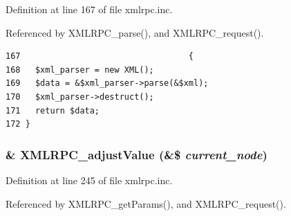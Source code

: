 Definition at line 167 of file xmlrpc.inc.

Referenced by XMLRPC\_\-parse(), and XMLRPC\_\-request().

\begin{Code}\begin{verbatim}167                                  {
168   $xml_parser = new XML();
169   $data = &$xml_parser->parse(&$xml);
170   $xml_parser->destruct();
171   return $data;
172 }
\end{verbatim}
\end{Code}


\hypertarget{xmlrpc_8inc_d936fe41ae9c3e0b90bd72ffe82a2969}{
\subsubsection{\setlength{\rightskip}{0pt plus 5cm}\& XMLRPC\_\-adjustValue (\&\$ {\em current\_\-node})}}
\label{xmlrpc_8inc_d936fe41ae9c3e0b90bd72ffe82a2969}




Definition at line 245 of file xmlrpc.inc.

Referenced by XMLRPC\_\-getParams(), and XMLRPC\_\-request().

